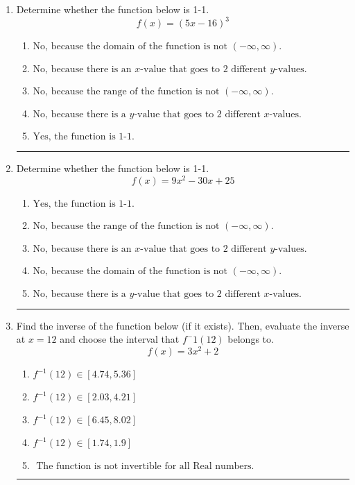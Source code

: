 \documentclass[14pt]{extbook}
\newcommand{\litem}[1]{\item#1\hspace*{-1cm}\rule{\textwidth}{0.4pt}}
\begin{document}
\begin{enumerate}
\litem{
Determine whether the function below is 1-1.\[ f(x) = (5 x - 16)^3 \]\begin{enumerate}[label=\Alph*.]
\item \( \text{No, because the domain of the function is not $(-\infty, \infty)$.} \)
\item \( \text{No, because there is an $x$-value that goes to 2 different $y$-values.} \)
\item \( \text{No, because the range of the function is not $(-\infty, \infty)$.} \)
\item \( \text{No, because there is a $y$-value that goes to 2 different $x$-values.} \)
\item \( \text{Yes, the function is 1-1.} \)

\end{enumerate} }
\litem{
Determine whether the function below is 1-1.\[ f(x) = 9 x^2 - 30 x + 25 \]\begin{enumerate}[label=\Alph*.]
\item \( \text{Yes, the function is 1-1.} \)
\item \( \text{No, because the range of the function is not $(-\infty, \infty)$.} \)
\item \( \text{No, because there is an $x$-value that goes to 2 different $y$-values.} \)
\item \( \text{No, because the domain of the function is not $(-\infty, \infty)$.} \)
\item \( \text{No, because there is a $y$-value that goes to 2 different $x$-values.} \)

\end{enumerate} }
\litem{
Find the inverse of the function below (if it exists). Then, evaluate the inverse at $x = 12$ and choose the interval that $f^-1(12)$ belongs to.\[ f(x) = 3 x^2 + 2 \]\begin{enumerate}[label=\Alph*.]
\item \( f^{-1}(12) \in [4.74, 5.36] \)
\item \( f^{-1}(12) \in [2.03, 4.21] \)
\item \( f^{-1}(12) \in [6.45, 8.02] \)
\item \( f^{-1}(12) \in [1.74, 1.9] \)
\item \( \text{ The function is not invertible for all Real numbers. } \)


\end{enumerate}}
\end{enumerate}
\end{document}
